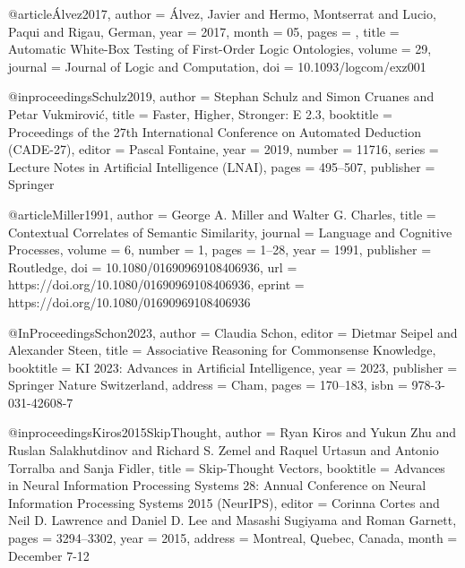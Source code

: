 \documentclass[english,version-2020-11]{uzl-thesis}
\begin{document}
\begin{bibtex-entries}
@article{Álvez2017,
    author = {Álvez, Javier and Hermo, Montserrat and Lucio, Paqui and Rigau, German},
    year = {2017},
    month = {05},
    pages = {},
    title = {Automatic White-Box Testing of First-Order Logic Ontologies},
    volume = {29},
    journal = {Journal of Logic and Computation},
    doi = {10.1093/logcom/exz001}
}


@inproceedings{Schulz2019,
  author    = {Stephan Schulz and Simon Cruanes and Petar Vukmirovi{\'c}},
  title     = {Faster, Higher, Stronger: {E} 2.3},
  booktitle = {Proceedings of the 27th International Conference on Automated Deduction (CADE-27)},
  editor    = {Pascal Fontaine},
  year      = {2019},
  number    = {11716},
  series    = {Lecture Notes in Artificial Intelligence (LNAI)},
  pages     = {495--507},
  publisher = {Springer}
}


@article{Miller1991,
  author    = {George A. Miller and Walter G. Charles},
  title     = {Contextual Correlates of Semantic Similarity},
  journal   = {Language and Cognitive Processes},
  volume    = {6},
  number    = {1},
  pages     = {1--28},
  year      = {1991},
  publisher = {Routledge},
  doi       = {10.1080/01690969108406936},
  url       = {https://doi.org/10.1080/01690969108406936},
  eprint    = {https://doi.org/10.1080/01690969108406936}
}


@InProceedings{Schon2023,
  author    = {Claudia Schon},
  editor    = {Dietmar Seipel and Alexander Steen},
  title     = {Associative Reasoning for Commonsense Knowledge},
  booktitle = {KI 2023: Advances in Artificial Intelligence},
  year      = {2023},
  publisher = {Springer Nature Switzerland},
  address   = {Cham},
  pages     = {170--183},
  isbn      = {978-3-031-42608-7}
}


@inproceedings{Kiros2015SkipThought,
  author    = {Ryan Kiros and Yukun Zhu and Ruslan Salakhutdinov and Richard S. Zemel and Raquel Urtasun and Antonio Torralba and Sanja Fidler},
  title     = {Skip-Thought Vectors},
  booktitle = {Advances in Neural Information Processing Systems 28: Annual Conference on Neural Information Processing Systems 2015 (NeurIPS)},
  editor    = {Corinna Cortes and Neil D. Lawrence and Daniel D. Lee and Masashi Sugiyama and Roman Garnett},
  pages     = {3294--3302},
  year      = {2015},
  address   = {Montreal, Quebec, Canada},
  month     = {December 7-12}
}


\end{bibtex-entries}
\end{document}
